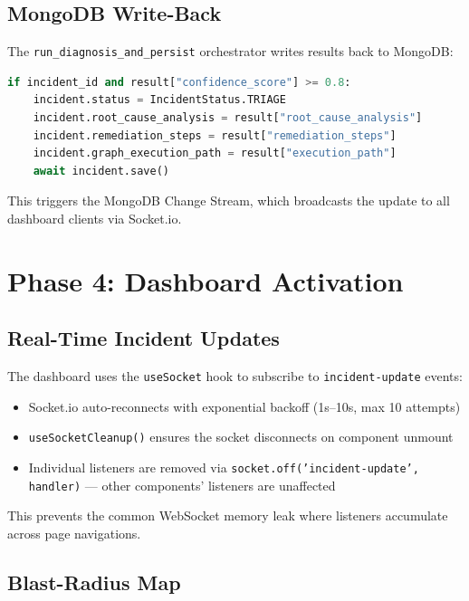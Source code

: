 \documentclass[11pt,a4paper]{article}
\begin{document}
\subsection{MongoDB Write-Back}

The \texttt{run\_diagnosis\_and\_persist} orchestrator writes results back to MongoDB:

\begin{lstlisting}[language=Python, caption=Diagnosis persistence]
if incident_id and result["confidence_score"] >= 0.8:
    incident.status = IncidentStatus.TRIAGE
    incident.root_cause_analysis = result["root_cause_analysis"]
    incident.remediation_steps = result["remediation_steps"]
    incident.graph_execution_path = result["execution_path"]
    await incident.save()
\end{lstlisting}

This triggers the MongoDB Change Stream, which broadcasts the update to all dashboard clients via Socket.io.

\section{Phase 4: Dashboard Activation}

\subsection{Real-Time Incident Updates}

The dashboard uses the \texttt{useSocket} hook to subscribe to \texttt{incident-update} events:

\begin{itemize}[leftmargin=*,itemsep=2pt]
  \item Socket.io auto-reconnects with exponential backoff (1s--10s, max 10 attempts)
  \item \texttt{useSocketCleanup()} ensures the socket disconnects on component unmount
  \item Individual listeners are removed via \texttt{socket.off('incident-update', handler)} — other components' listeners are unaffected
\end{itemize}

This prevents the common WebSocket memory leak where listeners accumulate across page navigations.

\subsection{Blast-Radius Map}
\end{document}

